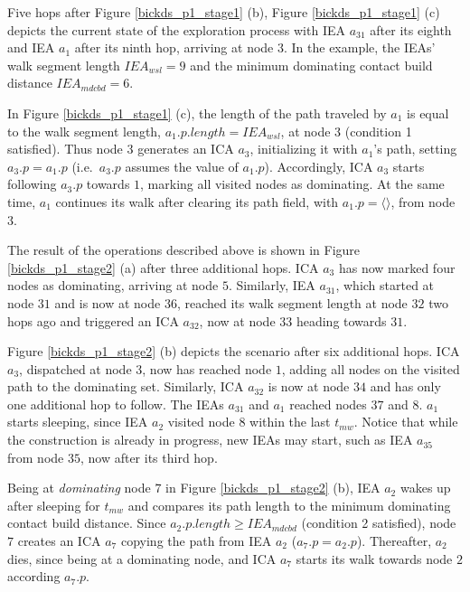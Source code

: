 
\exampleBegin

Five hops after Figure \ref{bickds_p1_stage1} (b), Figure \ref{bickds_p1_stage1} (c) depicts the current state of the exploration process with IEA $a_{31}$ after its eighth and IEA $a_1$ after its ninth hop, arriving at node $3$. In the example, the IEAs' walk segment length $IEA_{wsl}=9$ and the minimum dominating contact build distance $IEA_{mdcbd} = 6$. 

In Figure \ref{bickds_p1_stage1} (c), the length of the path traveled by $a_1$ is equal to the walk segment length, $a_1.p.length = IEA_{wsl}$, at node $3$ (condition 1 satisfied). Thus node $3$ generates an ICA $a_3$, initializing it with $a_1$'s path, setting $a_3.p=a_1.p$ (i.e.\ $a_3.p$ assumes the value of $a_1.p$). Accordingly, ICA $a_3$ starts following $a_3.p$ towards $1$, marking all visited nodes as dominating. At the same time, $a_1$ continues its walk after clearing its path field, with $a_1.p =\langle \rangle$, from node $3$.

The result of the operations described above is shown in Figure \ref{bickds_p1_stage2} (a)  after three additional hops. ICA $a_3$ has now marked four nodes as dominating, arriving at node $5$.  Similarly, IEA $a_{31}$, which started at node $31$ and is now at node $36$, reached its walk segment length at node $32$ two hops ago and triggered an ICA $a_{32}$, now at node $33$ heading towards $31$.

Figure \ref{bickds_p1_stage2} (b) depicts the scenario after six additional hops. ICA $a_3$, dispatched at node $3$, now has reached node $1$, adding all nodes on the visited path to the dominating set. Similarly, ICA $a_{32}$ is now at node $34$ and has only one additional hop to follow. The IEAs $a_{31}$ and $a_1$ reached nodes $37$ and $8$. $a_1$ starts sleeping, since IEA $a_2$ visited node $8$ within the last $t_{mw}$. Notice that while the construction is already in progress, new IEAs may start, such as IEA $a_{35}$ from node $35$, now after its third hop. 

Being at \emph{dominating} node $7$ in Figure \ref{bickds_p1_stage2} (b), IEA $a_2$ wakes up after sleeping for $t_{mw}$ and compares its path length to the minimum dominating contact build distance. Since $a_2.p.length\geq IEA_{mdcbd}$ (condition 2 satisfied), node $7$ creates an ICA $a_7$ copying the path from IEA $a_2$ ($a_7.p=a_2.p$). Thereafter, $a_2$ dies, since being at a dominating node, and ICA $a_7$ starts its walk towards node $2$ according $a_7.p$.

